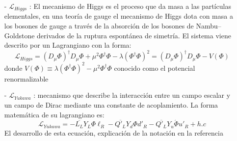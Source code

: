 \begin{itemize}
\item[-] $\mathcal{L}_{Higgs}$ : El mecanismo de Higgs es el proceso que da masa a las partículas elementales, en una teoría de gauge el mecanismo de Higgs dota con masa a los bosones de gauge a través de la absorción de los bosones de Nambu–Goldstone derivados de la ruptura espontánea de simetría. %
 El sistema viene descrito por un Lagrangiano con la forma:
\begin{equation}
\mathcal{L}_{Higgs} = 
(D_\mu \Phi)^\dagger D_\mu \Phi +
\mu^2 \Phi^\dagger \Phi -
\lambda (\Phi^\dagger \Phi)^2 = (D_\mu \Phi)^\dagger D_\mu \Phi - V(\Phi)
\end{equation}
donde $V(\Phi) \equiv \lambda (\Phi^\dagger \Phi)^2 - \mu^2 \Phi^\dagger \Phi$ conocido como el potencial renormalizable
\item[-] $\mathcal{L}_{Yukawa}$ : mecanismo que describe la interacción entre un campo escalar y un campo de Dirac mediante una constante de acoplamiento. La forma matemática de su lagrangiano es:
\begin{equation}
\mathcal{L}_{Yukawa} = -
\overline{L_L} Y_L \Phi \ell_R -
\overline{Q'_L} Y_d \Phi d'_R -
\overline{Q'_L}Y_u \acute{\Phi}u'_R + h.c
\end{equation}
El desarrollo de esta ecuación, explicación de la notación en la referencia \citep{santamaria_masses_1993, romao_resource_2012}


\end{itemize}

